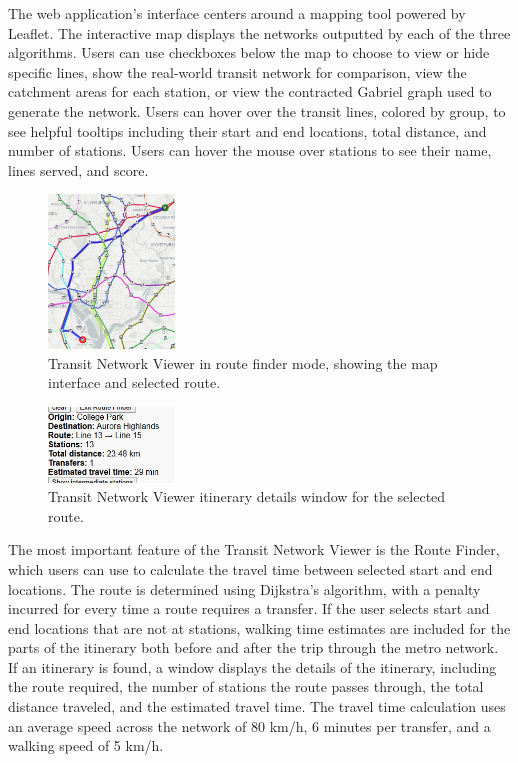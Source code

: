 \documentclass[sigconf,nonacm]{acmart}
\begin{document}
The web application's interface centers around a mapping tool powered by Leaflet. The interactive map displays the networks outputted by each of the three algorithms. Users can use checkboxes below the map to choose to view or hide specific lines, show the real-world transit network for comparison, view the catchment areas for each station, or view the contracted Gabriel graph used to generate the network. Users can hover over the transit lines, colored by group, to see helpful tooltips including their start and end locations, total distance, and number of stations. Users can hover the mouse over stations to see their name, lines served, and score. 

\begin{figure}[ht]
    \centering
    \includegraphics[width=0.3\textwidth]{./img/itin_1_gen.png}
    \caption{Transit Network Viewer in route finder mode, showing the map interface and selected route.}
    \label{fig:viewer_map}
\end{figure}

\begin{figure}[ht]
    \centering
    \includegraphics[width=0.3\textwidth]{./img/itin_1_gen_details.png}
    \caption{Transit Network Viewer itinerary details window for the selected route.}
    \label{fig:viewer_details}
\end{figure}

The most important feature of the Transit Network Viewer is the Route Finder, which users can use to calculate the travel time between selected start and end locations. The route is determined using Dijkstra's algorithm, with a penalty incurred for every time a route requires a transfer. If the user selects start and end locations that are not at stations, walking time estimates are included for the parts of the itinerary both before and after the trip through the metro network. If an itinerary is found, a window displays the details of the itinerary, including the route required, the number of stations the route passes through, the total distance traveled, and the estimated travel time. The travel time calculation uses an average speed across the network of 80 km/h, 6 minutes per transfer, and a walking speed of 5 km/h. 
\end{document}
